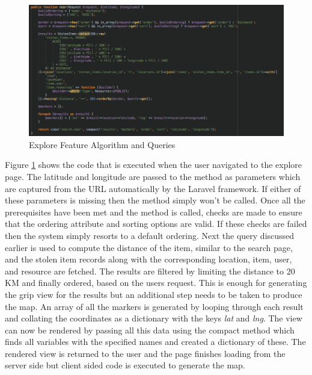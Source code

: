 \begin{figure}[H]
	\centering
	\includegraphics[width=1.0\textwidth]{images/Code/Explore}
	\caption{Explore Feature Algorithm and Queries} \label{fig:Explore_Code}
\end{figure}

Figure \ref{fig:Explore_Code} shows the code that is executed when the user navigated to the explore page. The latitude and longitude are passed to the method as parameters which are captured from the URL automatically by the Laravel framework. If either of these parameters is missing then the method simply won't be called. Once all the prerequisites have been met and the method is called, checks are made to ensure that the ordering attribute and sorting options are valid. If these checks are failed then the system simply resorts to a default ordering. Next the query discussed earlier is used to compute the distance of the item, similar to the search page, and the stolen item records along with the corresponding location, item, user, and resource are fetched. The results are filtered by limiting the distance to 20 KM and finally ordered, based on the users request. This is enough for generating the grip view for the results but an additional step needs to be taken to produce the map. An array of all the markers is generated by looping through each result and collating the coordinates as a dictionary with the keys \emph{lat} and \emph{lng}. The view can now be rendered by passing all this data using the compact method which finds all variables with the specified names and created a dictionary of these. The rendered view is returned to the user and the page finishes loading from the server side but client sided code is executed to generate the map.

